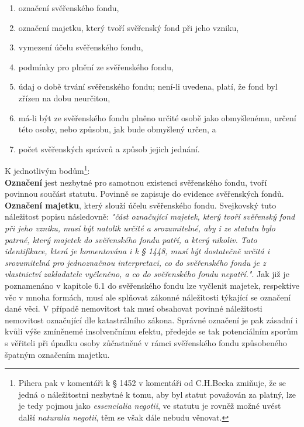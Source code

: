 \documentclass{article}
\begin{document}
\begin{enumerate}[label=\alph*)]
\item označení svěřenského fondu,
\item označení majetku, který tvoří svěřenský fond při jeho vzniku,
\item vymezení účelu svěřenského fondu,
\item podmínky pro plnění ze svěřenského fondu,
\item údaj o době trvání svěřenského fondu; není-li uvedena, platí, že fond byl zřízen na dobu neurčitou,
\item má-li být ze svěřenského fondu plněno určité osobě jako obmyšlenému, určení této osoby, nebo způsobu, jak bude obmyšlený určen, a
\item počet svěřenských správců a způsob jejich jednání.	\\
\end{enumerate}

K jednotlivým bodům\footnote{Pihera pak v komentáři k § 1452 v komentáři od C.H.Becka zmiňuje, že se jedná o náležitostni nezbytné k tomu, aby byl statut považován za platný, lze je tedy pojmou jako \textit{essencialia negotii}, ve statutu je rovněž možné uvést další \textit{naturalia negotii}, těm se však dále nebudu věnovat.}:\\

\textbf{Označení} jest nezbytné pro samotnou existenci svěřenského fondu, tvoří povinnou součást statutu. Povinně se zapisuje do evidence svěřenských fondů.\\

\textbf{Označení majetku}, který slouží účelu svěřenského fondu. Svejkovský tuto náležitost popisu následovně: \textit{"část označující majetek, který tvoří svěřenský fond při jeho vzniku, musí být natolik určité a srozumitelné, aby i ze statutu bylo patrné, který majetek do svěřenského fondu patří, a který nikoliv. Tato identifikace, která je komentována i k § 1448, musí být dostatečně určitá i srozumitelná pro jednoznačnou interpretaci, co do svěřenského fondu je z vlastnictví zakladatele vyčleněno, a co do svěřenského fondu nepatří."}. Jak již je poznamenáno v kapitole 6.1 do svěřenského fondu lze vyčlenit majetek, respektive věc v mnoha formách, musí ale splňovat zákonné náležitosti týkající se označení dané věci. V případě nemovitost tak musí obsahovat povinné náležitosti nemovitost označující dle katastrálního zákona. Správné označení je pak zásadní i kvůli výše zmíněnemé insolvenčnímu efektu, předejde se tak potenciálním sporům s věřiteli při úpadku osoby zůčastněné v rámci svěřenského fondu způsobeného špatným označením majetku.\\
\end{document}
